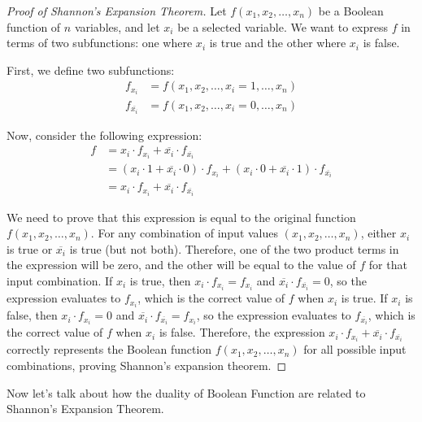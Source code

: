     \begin{proof}[Proof of Shannon's Expansion Theorem]
        Let $f(x_1, x_2, \ldots, x_n)$ be a Boolean function of $n$ variables, and let $x_i$ be a selected variable. We want to express $f$ in terms of two subfunctions: one where $x_i$ is true and the other where $x_i$ is false.
        
        First, we define two subfunctions:
        \begin{align*}
        f_{x_i} &= f(x_1, x_2, \ldots, x_i=1, \ldots, x_n) \\
        f_{\overline{x_i}} &= f(x_1, x_2, \ldots, x_i=0, \ldots, x_n)
        \end{align*}
        
        Now, consider the following expression:
        \begin{align*}
        f &= x_i \cdot f_{x_i} + \overline{x_i} \cdot f_{\overline{x_i}} \\
           &= (x_i \cdot 1 + \overline{x_i} \cdot 0) \cdot f_{x_i} + (x_i \cdot 0 + \overline{x_i} \cdot 1) \cdot f_{\overline{x_i}} \\
           &= x_i \cdot f_{x_i} + \overline{x_i} \cdot f_{\overline{x_i}}
        \end{align*}
        
        We need to prove that this expression is equal to the original function $f(x_1, x_2, \ldots, x_n)$.
        For any combination of input values $(x_1, x_2, \ldots, x_n)$, either $x_i$ is true or $\overline{x_i}$ is true (but not both). Therefore, one of the two product terms in the expression will be zero, and the other will be equal to the value of $f$ for that input combination.
        If $x_i$ is true, then $x_i \cdot f_{x_i} = f_{x_i}$ and $\overline{x_i} \cdot f_{\overline{x_i}} = 0$, so the expression evaluates to $f_{x_i}$, which is the correct value of $f$ when $x_i$ is true.      
        If $x_i$ is false, then $x_i \cdot f_{x_i} = 0$ and $\overline{x_i} \cdot f_{\overline{x_i}} = f_{{x_i}}$, so the expression evaluates to $f_{\overline{x_i}}$, which is the correct value of $f$ when $x_i$ is false.
        Therefore, the expression $x_i \cdot f_{x_i} + \overline{x_i} \cdot f_{\overline{x_i}}$ correctly represents the Boolean function $f(x_1, x_2, \ldots, x_n)$ for all possible input combinations, proving Shannon's expansion theorem.
        \end{proof}
        
    Now let's talk about how the duality of Boolean Function are related to Shannon's Expansion Theorem.
